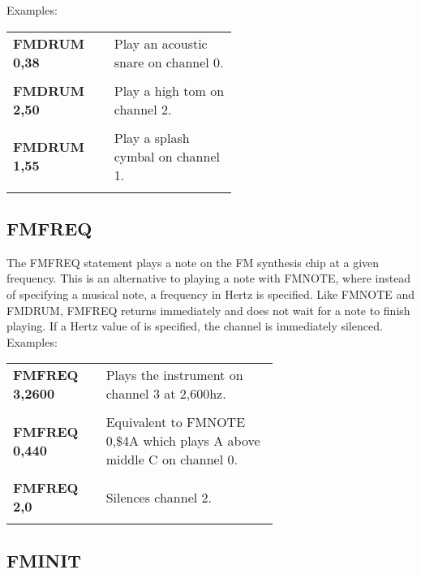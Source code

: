 Examples:\\

\begin{tabular}{l p{0.55\linewidth}}

	{\ttfamily\bfseries FMDRUM 0,38}&Play an acoustic snare on channel 0.\\\\

	{\ttfamily\bfseries FMDRUM 2,50}&Play a high tom on channel 2.\\\\

	{\ttfamily\bfseries FMDRUM 1,55}&Play a splash cymbal on channel 1.\\\\

\end{tabular}

\subsection{FMFREQ}

The {\ttfamily FMFREQ} statement plays a note on the FM synthesis chip at a
given frequency.  This is an alternative to playing a note with {\ttfamily
FMNOTE}, where instead of specifying a musical note, a frequency in Hertz is
specified.  Like {\ttfamily FMNOTE} and {\ttfamily FMDRUM}, {\ttfamily FMFREQ}
returns immediately and does not wait for a note to finish playing.  If a Hertz
value of {} is specified, the channel is immediately silenced.\\

Examples:\\

\begin{tabular}{l p{0.65\linewidth}}

	{\ttfamily\bfseries FMFREQ 3,2600}&Plays the instrument on channel 3 at 2,600hz.\\\\

	{\ttfamily\bfseries FMFREQ 0,440}&Equivalent to {\ttfamily FMNOTE 0,\$4A}
	which plays A above middle C on channel 0.\\\\

	{\ttfamily\bfseries FMFREQ 2,0}&Silences channel 2.\\\\

\end{tabular}

\subsection{FMINIT}

